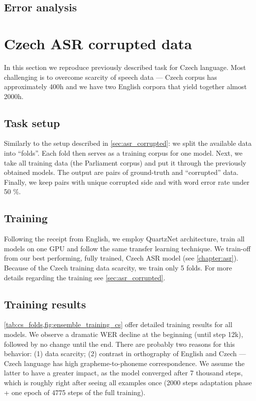 \subsection{Error analysis}

\section{Czech ASR corrupted data}
\label{sec:asr_corrupted_cs}
In this section we reproduce previously described task for Czech language. Most challenging is to overcome scarcity of speech data --- Czech corpus has approximately 400h and we have two English corpora that yield together almost 2000h.

\subsection{Task setup}
Similarly to the setup described in \cref{sec:asr_corrupted}: we split the available data into ``folds''. Each fold then serves as a training corpus for one model. Next, we take all training data (the Parliament corpus) and put it through the previously obtained models. The output are pairs of ground-truth and ``corrupted'' data. Finally, we keep pairs with unique corrupted side and with word error rate under 50 \%.

\subsection{Training}
Following the receipt from English, we employ QuartzNet architecture, train all models on one GPU and follow the same transfer learning technique. We train-off from our best performing, fully trained, Czech ASR model (see \cref{chapter:asr}). Because of the Czech training data scarcity, we train only 5 folds. For more details regarding the training see \cref{sec:asr_corrupted}.

\subsection{Training results}
\cref{tab:cs_folds,fig:ensemble_training_cs} offer detailed training results for all models. We observe a dramatic WER decline at the beginning (until step 12k), followed by no change until the end. There are probably two reasons for this behavior: (1) data scarcity; (2) contrast in orthography of English and Czech --- Czech language has high grapheme-to-phoneme correspondence. We assume the latter to have a greater impact, as the model converged after 7 thousand steps, which is roughly right after seeing all examples once (2000 steps adaptation phase + one epoch of 4775 steps of the full training).

